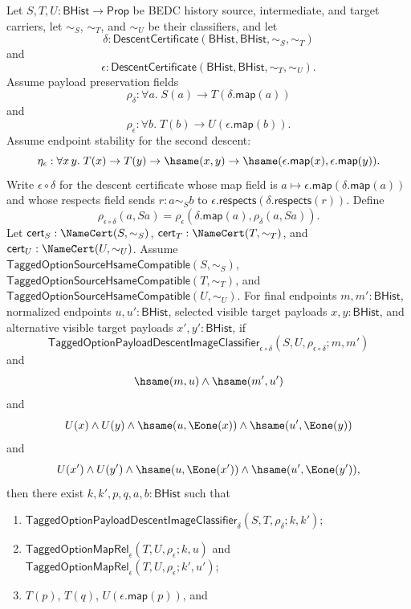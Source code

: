 \begin{theorem}
\label{thm:tagged-option-composite-image-classifier-normalized-visible-public-factorization-representative-independent}
Let $S,T,U:\mathsf{BHist}\to\mathsf{Prop}$ be BEDC history source,
intermediate, and target carriers, let $\sim_S$, $\sim_T$, and $\sim_U$ be their
classifiers, and let
$$
\delta:\mathsf{DescentCertificate}(\mathsf{BHist},\mathsf{BHist},\sim_S,\sim_T)
$$
and
$$
\epsilon:\mathsf{DescentCertificate}(\mathsf{BHist},\mathsf{BHist},\sim_T,\sim_U).
$$
Assume payload preservation fields
$$
\rho_{\delta}:\forall a.\;S(a)\to T(\delta.\mathsf{map}(a))
$$
and
$$
\rho_{\epsilon}:\forall b.\;T(b)\to U(\epsilon.\mathsf{map}(b)).
$$
Assume endpoint stability for the second descent:
$$
\eta_{\epsilon}:\forall x\,y.\;
T(x)\to T(y)\to \hsame(x,y)\to
\hsame(\epsilon.\mathsf{map}(x),\epsilon.\mathsf{map}(y)).
$$
Write $\epsilon\circ\delta$ for the descent certificate whose map field is
$a\mapsto\epsilon.\mathsf{map}(\delta.\mathsf{map}(a))$ and whose respects field
sends $r:a\sim_S b$ to
$\epsilon.\mathsf{respects}(\delta.\mathsf{respects}(r))$. Define
$$
\rho_{\epsilon\circ\delta}(a,Sa)=
\rho_{\epsilon}(\delta.\mathsf{map}(a),\rho_{\delta}(a,Sa)).
$$
Let $\mathsf{cert}_S:\NameCert(S,\sim_S)$,
$\mathsf{cert}_T:\NameCert(T,\sim_T)$, and
$\mathsf{cert}_U:\NameCert(U,\sim_U)$. Assume
$\mathsf{TaggedOptionSourceHsameCompatible}(S,\sim_S)$,
$\mathsf{TaggedOptionSourceHsameCompatible}(T,\sim_T)$, and
$\mathsf{TaggedOptionSourceHsameCompatible}(U,\sim_U)$. For final endpoints
$m,m':\mathsf{BHist}$, normalized endpoints $u,u':\mathsf{BHist}$, selected
visible target payloads $x,y:\mathsf{BHist}$, and alternative visible target
payloads $x',y':\mathsf{BHist}$, if
$$
\mathsf{TaggedOptionPayloadDescentImageClassifier}_{\epsilon\circ\delta}
(S,U,\rho_{\epsilon\circ\delta};m,m')
$$
and
$$
\hsame(m,u)\land \hsame(m',u')
$$
and
$$
U(x)\land U(y)\land
\hsame(u,\Eone(x))\land \hsame(u',\Eone(y))
$$
and
$$
U(x')\land U(y')\land
\hsame(u,\Eone(x'))\land \hsame(u',\Eone(y')),
$$
then there exist $k,k',p,q,a,b:\mathsf{BHist}$ such that
\begin{enumerate}
\item $\mathsf{TaggedOptionPayloadDescentImageClassifier}_{\delta}
(S,T,\rho_{\delta};k,k')$;
\item $\mathsf{TaggedOptionMapRel}_{\epsilon}(T,U,\rho_{\epsilon};k,u)$ and
$\mathsf{TaggedOptionMapRel}_{\epsilon}(T,U,\rho_{\epsilon};k',u')$;
\item $T(p)$, $T(q)$, $U(\epsilon.\mathsf{map}(p))$, and

\end{enumerate}
\end{theorem}
